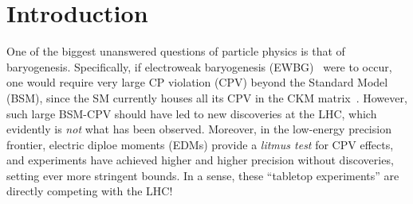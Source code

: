 \chapter{Introduction}
\label{ch:intro}

One of the biggest unanswered questions of particle physics is that of baryogenesis.
Specifically, if electroweak baryogenesis (EWBG)~\cite{EWBG} were to occur, one would require very large CP violation (CPV) beyond the Standard Model (BSM), since the SM currently houses all its CPV in the CKM matrix~\cite{PDG}.
However, such large BSM-CPV should have led to new discoveries at the LHC, which evidently is \textit{not} what has been observed.
Moreover, in the low-energy precision frontier, electric diploe moments (EDMs) provide a \textit{litmus test} for CPV effects, and experiments have achieved higher and higher precision without discoveries, setting ever more stringent bounds.
In a sense, these ``tabletop experiments'' are directly competing with the LHC!

